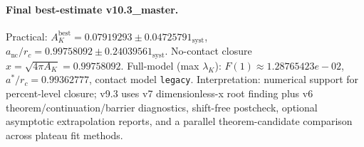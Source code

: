 \paragraph{Final best-estimate v10.3_master.}
Practical: $A_K^{\mathrm{best}} = 0.07919293 \pm 0.04725791_{\mathrm{syst}}$, $a_{\mathrm{nc}}/r_c = 0.99758092 \pm 0.24039561_{\mathrm{syst}}$.
No-contact closure $x = \sqrt{4\pi A_K} = 0.99758092$.
Full-model (max $\lambda_K$): $F(1) \approx 1.28765423e-02$, $a^*/r_c = 0.99362777$, contact model \texttt{legacy}.
Interpretation: numerical support for percent-level closure; v9.3 uses v7 dimensionless-x root finding plus v6 theorem/continuation/barrier diagnostics, shift-free postcheck, optional asymptotic extrapolation reports, and a parallel theorem-candidate comparison across plateau fit methods.

